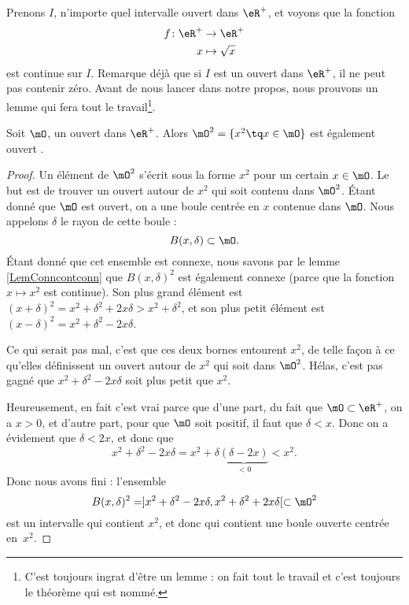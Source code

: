 Prenons $I$, n'importe quel intervalle ouvert dans $\eR^+$, et voyons que la fonction
\begin{equation}
\begin{aligned}
 f\colon \eR^+&\to \eR^+ \\ 
   x&\mapsto \sqrt{x} 
\end{aligned}
\end{equation}
est continue sur $I$. Remarque déjà que si $I$ est un ouvert dans $\eR^+$, il ne peut pas contenir zéro. Avant de nous lancer dans notre propos, nous prouvons un lemme qui fera tout le travail\footnote{C'est toujours ingrat d'être un lemme : on fait tout le travail et c'est toujours le théorème qui est nommé.}.

\begin{lemma}
Soit $\mO$, un ouvert dans $\eR^+$. Alors $\mO^2=\{ x^2\tq x\in\mO \}$ est également ouvert .
\end{lemma}

\begin{proof}
Un élément de $\mO^2$ s'écrit sous la forme $x^2$ pour un certain $x\in\mO$. Le but est de trouver un ouvert autour de $x^2$ qui soit contenu dans $\mO^2$. Étant donné que $\mO$ est ouvert, on a une boule centrée en $x$ contenue dans $\mO$. Nous appelons $\delta$ le rayon de cette boule :
\[ 
  B(x,\delta)\subset\mO.
\]
Étant donné que cet ensemble est connexe, nous savons par le lemme \ref{LemConncontconn} que $B(x,\delta)^2$ est également connexe (parce que la fonction $x\mapsto x^2$ est continue). Son plus grand élément est $(x+\delta)^2=x^2+\delta^2+2x\delta>x^2+\delta^2$, et son plus petit élément est $(x-\delta)^2=x^2+\delta^2-2x\delta$. 

Ce qui serait pas mal, c'est que ces deux bornes entourent $x^2$, de telle façon à ce qu'elles définissent un ouvert autour de $x^2$ qui soit dans $\mO^2$. Hélas, c'est pas gagné que $x^2+\delta^2-2x\delta$ soit plus petit que $x^2$. 

Heureusement, en fait c'est vrai parce que d'une part, du fait que $\mO\subset\eR^+$, on a $x>0$, et d'autre part, pour que $\mO$ soit positif, il faut que $\delta<x$. Donc on a évidement que $\delta<2x$, et donc que
\[ 
  x^2+\delta^2-2x\delta=x^2+\delta\underbrace{(\delta-2x)}_{<0}<x^2.
\]
Donc nous avons fini : l'ensemble
\[ 
  B(x,\delta)^2=]x^2+\delta^2-2x\delta,x^2+\delta^2+2x\delta[\subset\mO^2
\]
est un intervalle qui contient $x^2$, et donc qui contient une boule ouverte centrée en~$x^2$.

\end{proof}

